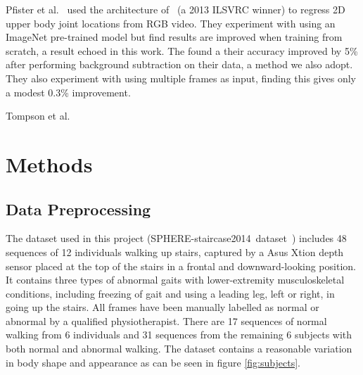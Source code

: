 \documentclass[11pt]{article} %
\begin{document}
Pfister et al.~\cite{Pfister} used the architecture of~\cite{Sermanet2013a} (a 2013 ILSVRC winner) to regress 2D upper body joint locations from RGB video. They experiment with using an ImageNet pre-trained model but find results are improved when training from scratch, a result echoed in this work. The found a their accuracy improved by 5\% after performing background subtraction on their data, a method we also adopt. They also experiment with using multiple frames as input, finding this gives only a modest 0.3\% improvement. 

Tompson et al.~\cite{Tompson2014}




\section{Methods}

\subsection{Data Preprocessing}
\label{sec:preprocessing}

The dataset used in this project (SPHERE-staircase2014~dataset~\cite{Paiement}) includes 48 sequences of 12 individuals walking up stairs, captured by a Asus Xtion depth sensor placed at the top of the stairs in a frontal and downward-looking position. It contains three types of abnormal gaits with lower-extremity musculoskeletal conditions, including freezing of gait and using a leading leg, left or right, in going up the stairs. All frames have been manually labelled as normal or abnormal by a qualified physiotherapist. There are 17 sequences of normal walking from 6 individuals and 31 sequences from the remaining 6 subjects with both normal and abnormal walking. The dataset contains a reasonable variation in body shape and appearance as can be seen in figure \ref{fig:subjects}.
\end{document}
